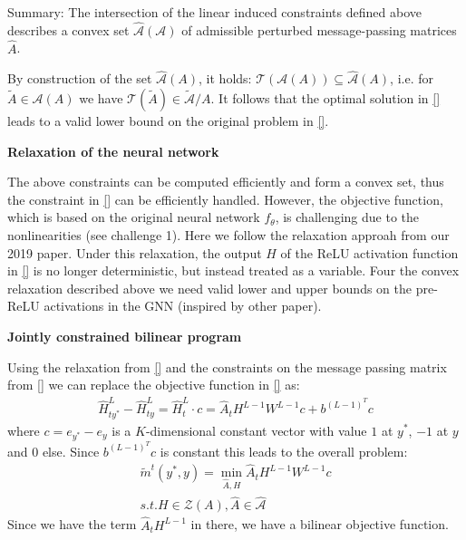 \documentclass[a4paper,preprint]{sig-alternate}
\begin{document}
Summary: The intersection of the linear induced constraints defined above describes a convex set $\mathcal{\hat{A}}(\mathcal{A})$ of admissible
perturbed message-passing matrices $\hat{A}$.\newline

By construction of the set $\mathcal{\hat{A}}(A)$, it holds:\newline
$\mathcal{T}(\mathcal{A}(A)) \subseteq \mathcal{\hat{A}}(A)$, i.e. for $\tilde{A} \in \mathcal{A}(A)$ we have $\mathcal{T}(\tilde{A}) \in \mathcal{\tilde{A}}/A$.
It follows that the optimal solution in \ref{} leads to a valid lower bound on the original problem in \ref{}.\newline

\textbf{Relaxation of the neural network}\newline

The above constraints can be computed efficiently and form a convex set, thus the constraint in \ref{} can be efficiently handled.
However, the objective function, which is based on the original neural network $f_{\theta}$, is challenging due to the nonlinearities (see challenge 1).
Here we follow the relaxation approah from our 2019 paper. Under this relaxation, the output $H$ of the ReLU activation function in \ref{}
is no longer deterministic, but instead treated as a variable. Four the convex relaxation described above we need valid lower and upper bounds
on the pre-ReLU activations in the GNN (inspired by other paper).\newline

\textbf{Jointly constrained bilinear program}\newline

Using the relaxation from \ref{} and the constraints on the message passing matrix from \ref{} we can replace the objective function in \ref{}
as:
\begin{gather}
    \hat{H}_{ty^{\ast}}^L - \hat{H}_{ty}^L = \hat{H}_t^L \cdot c = \hat{A}_t H^{L-1} W^{L-1} c + b^{(L-1)^T} c
\end{gather}
where $c = e_{y^{\ast}} - e_y$ is a $K$-dimensional constant vector with value $1$ at $y^{\ast}$, $-1$ at $y$ and $0$ else.
Since $b^{(L-1)^T} c$ is constant this leads to the overall problem:
\begin{gather}
    \tilde{m}^t (y^{\ast}, y) = \min_{\hat{A}, H} \hat{A}_t H^{L-1} W^{L-1} c \\
    s.t. H \in \mathcal{Z}(A), \hat{A} \in \mathcal{\hat{A}}
\end{gather}
Since we have the term $\hat{A}_t H^{L-1}$ in there, we have a bilinear objective function.\newline
\end{document}
